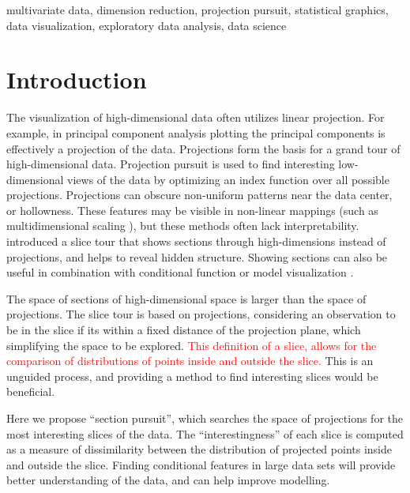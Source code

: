 \documentclass[]{interact}
\theoremstyle{plain}%
\theoremstyle{definition}
\theoremstyle{remark}
\begin{document}
\begin{keywords}
multivariate data, dimension reduction, projection pursuit, statistical
graphics, data visualization, exploratory data analysis, data science
\end{keywords}

\hypersetup{linkcolor=black}
  \tableofcontents

\newpage

\hypertarget{introduction}{%
\section{Introduction}\label{introduction}}

The visualization of high-dimensional data often utilizes linear
projection. For example, in principal component analysis plotting the
principal components is effectively a projection of the data.
Projections form the basis for a grand tour \citep{As85} of
high-dimensional data. Projection pursuit \citep[\citet{FT74}]{kr69} is
used to find interesting low-dimensional views of the data by optimizing
an index function over all possible projections. Projections can obscure
non-uniform patterns near the data center, or hollowness. These features
may be visible in non-linear mappings (such as multidimensional scaling
\citep{mds}), but these methods often lack interpretability.
\citet{laa2019slice} introduced a slice tour that shows sections through
high-dimensions instead of projections, and helps to reveal hidden
structure. Showing sections can also be useful in combination with
conditional function or model visualization
\citep[\citet{sliceplorer}]{JSSv081i05}.

The space of sections of high-dimensional space is larger than the space
of projections. The slice tour is based on projections, considering an
observation to be in the slice if its within a fixed distance of the
projection plane, which simplifying the space to be explored.
\textcolor{red}{This definition of a slice, allows for the comparison of  distributions of points inside and outside the slice.}
This is an unguided process, and providing a method to find interesting
slices would be beneficial.

Here we propose ``section pursuit'', which searches the space of
projections for the most interesting slices of the data. The
``interestingness'' of each slice is computed as a measure of
dissimilarity between the distribution of projected points inside and
outside the slice. Finding conditional features in large data sets will
provide better understanding of the data, and can help improve
modelling.
\end{document}

